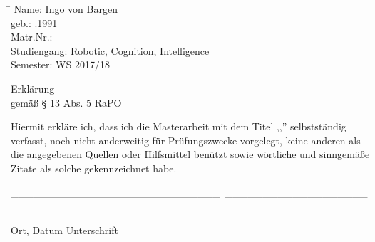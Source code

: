 \begin{tabbing}
\hspace{3cm}\=\kill
 Name: \> Ingo von Bargen\\
 geb.: .1991\\
 Matr.Nr.: \\
 Studiengang: \> Robotic, Cognition, Intelligence\\
 Semester: \> WS 2017/18\\
\end{tabbing}


{
\begin{center}
{\huge Erklärung}\\
gemäß § 13 Abs. 5 RaPO
\end{center}
}


Hiermit erkläre ich, dass ich die Masterarbeit mit dem Titel ,,\workTitel'' selbstständig verfasst, noch nicht anderweitig für Prüfungszwecke vorgelegt, keine anderen als die angegebenen Quellen oder Hilfsmittel benützt
sowie wörtliche und sinngemäße Zitate als solche gekennzeichnet habe.



\_\_\_\_\_\_\_\_\_\_\_\_\_\_\_\_\_\_\_\_\_\_\_\_\_\_\_\_\quad \quad \quad \quad \quad \quad \quad \quad \quad \quad \  \_\_\_\_\_\_\_\_\_\_\_\_\_\_\_\_\_\_\_\_\_\_\_\_\_\_\_\_

Ort, Datum \quad \quad \quad \quad \quad \quad \quad \quad \quad \quad \quad \quad \quad \quad \quad Unterschrift